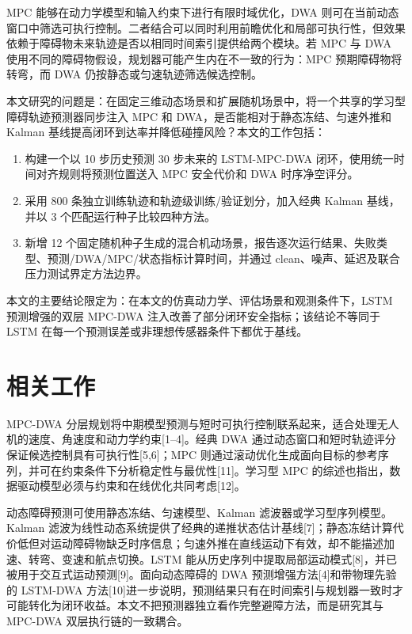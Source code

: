 \documentclass[11pt,a4paper]{ctexart}
\begin{document}
MPC 能够在动力学模型和输入约束下进行有限时域优化，DWA 则可在当前动态窗口中筛选可执行控制。二者结合可以同时利用前瞻优化和局部可执行性，但效果依赖于障碍物未来轨迹是否以相同时间索引提供给两个模块。若 MPC 与 DWA 使用不同的障碍物假设，规划器可能产生内在不一致的行为：MPC 预期障碍物将转弯，而 DWA 仍按静态或匀速轨迹筛选候选控制。

本文研究的问题是：在固定三维动态场景和扩展随机场景中，将一个共享的学习型障碍轨迹预测器同步注入 MPC 和 DWA，是否能相对于静态冻结、匀速外推和 Kalman 基线提高闭环到达率并降低碰撞风险？本文的工作包括：

\begin{enumerate}[leftmargin=*]
\item 构建一个以 10 步历史预测 30 步未来的 LSTM-MPC-DWA 闭环，使用统一时间对齐规则将预测位置送入 MPC 安全代价和 DWA 时序净空评分。
\item 采用 800 条独立训练轨迹和轨迹级训练/验证划分，加入经典 Kalman 基线，并以 3 个匹配运行种子比较四种方法。
\item 新增 12 个固定随机种子生成的混合机动场景，报告逐次运行结果、失败类型、预测/DWA/MPC/状态指标计算时间，并通过 clean、噪声、延迟及联合压力测试界定方法边界。
\end{enumerate}

本文的主要结论限定为：在本文的仿真动力学、评估场景和观测条件下，LSTM 预测增强的双层 MPC-DWA 注入改善了部分闭环安全指标；该结论不等同于 LSTM 在每一个预测误差或非理想传感器条件下都优于基线。

\section{相关工作}

MPC-DWA 分层规划将中期模型预测与短时可执行控制联系起来，适合处理无人机的速度、角速度和动力学约束[1–4]。经典 DWA 通过动态窗口和短时轨迹评分保证候选控制具有可执行性[5,6]；MPC 则通过滚动优化生成面向目标的参考序列，并可在约束条件下分析稳定性与最优性[11]。学习型 MPC 的综述也指出，数据驱动模型必须与约束和在线优化共同考虑[12]。

动态障碍预测可使用静态冻结、匀速模型、Kalman 滤波器或学习型序列模型。Kalman 滤波为线性动态系统提供了经典的递推状态估计基线[7]；静态冻结计算代价低但对运动障碍物缺乏时序信息；匀速外推在直线运动下有效，却不能描述加速、转弯、变速和航点切换。LSTM 能从历史序列中提取局部运动模式[8]，并已被用于交互式运动预测[9]。面向动态障碍的 DWA 预测增强方法[4]和带物理先验的 LSTM-DWA 方法[10]进一步说明，预测结果只有在时间索引与规划器一致时才可能转化为闭环收益。本文不把预测器独立看作完整避障方法，而是研究其与 MPC-DWA 双层执行链的一致耦合。
\end{document}
